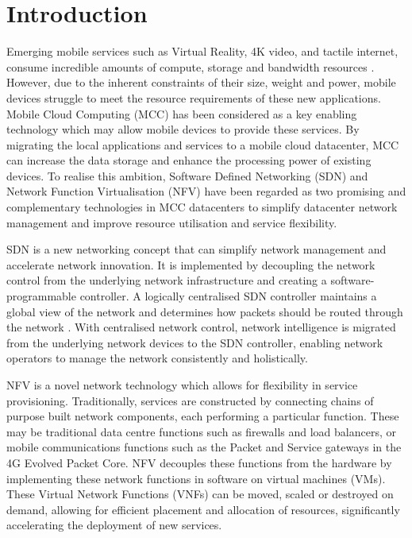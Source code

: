
\section{Introduction}
\label{sec:introduction}

Emerging mobile services such as Virtual Reality, 4K video, and tactile internet, consume incredible amounts of compute, storage and bandwidth resources \cite{AndrewsBCHLSZ14}. However, due to the inherent constraints of their size, weight and power, mobile devices struggle to meet the resource requirements of these new applications. Mobile Cloud Computing (MCC) \cite{LiSHGXX18, RahimiVMV18} has been considered as a key enabling technology which may allow mobile devices to provide these services. By migrating the local applications and services to a mobile cloud datacenter, MCC can increase the data storage and enhance the processing power of existing devices. To realise this ambition, Software Defined Networking (SDN) and Network Function Virtualisation (NFV) have been regarded as two promising and complementary technologies in MCC datacenters to simplify datacenter network management and improve resource utilisation and service flexibility. 

SDN is a new networking concept that can simplify network management and accelerate network innovation. It is implemented by decoupling the network control from the underlying network infrastructure and creating a software-programmable controller. A logically centralised SDN controller maintains a global view of the network and determines how packets should be routed through the network \cite{KimF13, HaresW13}. With centralised network control, network intelligence is migrated from the underlying network devices to the SDN controller, enabling network operators to manage the network consistently and holistically. 

NFV is a novel network technology which allows for flexibility in service provisioning. Traditionally, services are constructed by connecting chains of purpose built network components, each performing a particular function. These may be traditional data centre functions such as firewalls and load balancers, or mobile communications functions such as the Packet and Service gateways in the 4G Evolved Packet Core. NFV decouples these functions from the hardware by implementing these network functions in software on virtual machines (VMs). These Virtual Network Functions (VNFs) can be moved, scaled or destroyed on demand, allowing for efficient placement and allocation of resources, significantly accelerating the deployment of new services. 

